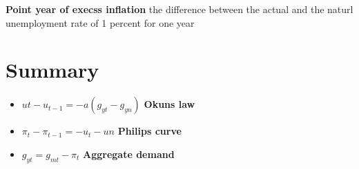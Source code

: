 \documentclass[,twocolumn]{article}
\providecommand{\tightlist}{%
  \setlength{\itemsep}{0pt}\setlength{\parskip}{0pt}}
\begin{document}
\textbf{Point year of execss inflation} the difference between the
actual and the naturl unemployment rate of 1 percent for one year

\hypertarget{summary}{%
\section{Summary}\label{summary}}

\begin{itemize}
\tightlist
\item
  \(ut - u_{t-1} = -a(g_{yt}-g_{yn})\) \textbf{Okuns law}
\item
  \(\pi_t - \pi_{t-1} = -{u_t-un}\) \textbf{Philips curve}
\item
  \(g_{yt} = g_{mt} -\pi_t\) \textbf{Aggregate demand}
\end{itemize}
\end{document}
